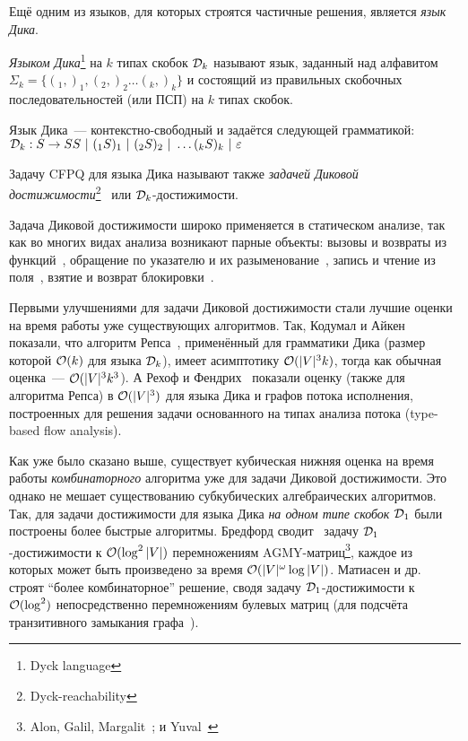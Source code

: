 Ещё одним из языков, для которых строятся частичные решения, является \textit{язык Дика}.

\begin{definition}\label{def:dyck}
  \textit{Языком Дика}\footnote{Dyck language} на $k$ типах скобок $\mathcal{D}_k$ называют язык, заданный над алфавитом $\Sigma_k = \{ (_1, )_1, (_2, )_2 \dots (_k, )_k \}$ и состоящий из правильных скобочных последовательностей (или ПСП) на $k$ типах скобок.

  Язык Дика~--- контекстно-свободный и задаётся следующей грамматикой:\\ $\mathcal{D}_k : S \rightarrow S S~|~(_1 S )_1 ~|~ (_2 S )_2~|~ \dots (_k S )_k ~|~ \varepsilon$

\end{definition}

\begin{definition}\label{def:dyck_reach}
  Задачу CFPQ для языка Дика называют также \textit{задачей Диковой достижимости}\footnote{Dyck-reachability}~\cite{Kodumal04} или $\mathcal{D}_k$-достижимости.
\end{definition}

Задача Диковой достижимости широко применяется в статическом анализе, так как во многих видах анализа возникают парные объекты: вызовы и возвраты из функций~\cite{Tang15}, обращение по указателю и их разыменование~\cite{Zheng08}, запись и чтение из поля~\cite{Yan11}, взятие и возврат блокировки~\cite{Kahlon09}.

Первыми улучшениями для задачи Диковой достижимости стали лучшие оценки на время работы уже существующих алгоритмов. Так, Кодумал и Айкен~\cite{Kodumal04} показали, что алгоритм Репса~\cite{Reps97}, применённый для грамматики Дика (размер которой $\mathcal{O}(k)$ для языка $\mathcal{D}_k$), имеет асимптотику $\mathcal{O}(|V|^3 k)$, тогда как обычная оценка~--- $\mathcal{O}(|V|^3 k^3$). А Рехоф и Фендрих~\cite{Rehof01} показали оценку (также для алгоритма Репса) в $\mathcal{O}(|V|^3)$ для языка Дика и графов потока исполнения, построенных для решения задачи основанного на типах анализа потока (type-based flow analysis).

Как уже было сказано выше, существует кубическая нижняя оценка на время работы \textit{комбинаторного} алгоритма уже для задачи Диковой достижимости. Это однако не мешает существованию субкубических алгебраических алгоритмов. Так, для задачи достижимости для языка Дика \textit{на одном типе скобок} $\mathcal{D}_1$ были построены более быстрые алгоритмы. Бредфорд сводит~\cite{Bradford17} задачу $\mathcal{D}_1$-достижимости к $\mathcal{O}(\log^2 |V|)$ перемножениям AGMY-матриц\footnote{Alon, Galil, Margalit~\cite{Alon1997}; и Yuval~\cite{Yuval1976}}, каждое из которых может быть произведено за время $\mathcal{O}(|V|^{\omega} \log |V|)$. Матиасен и др.~\cite{Mathiasen21} строят ``более комбинаторное'' решение, сводя задачу $\mathcal{D}_1$-достижимости к $\mathcal{O}(\log^2)$ непосредственно перемножениям булевых матриц (для подсчёта транзитивного замыкания графа~\cite{Aho1974}).

